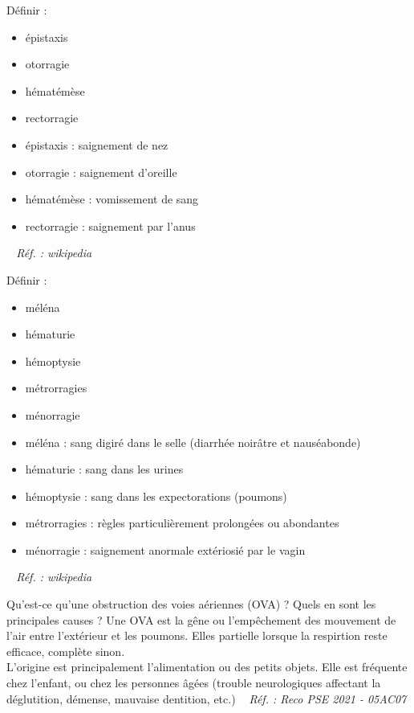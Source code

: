 \documentclass[grid,avery5371,landscape]{flashcards}
\makeatletter
\newcounter{nocarte}
\newcommand{\categ}[1]{%
  \def\@categ{#1}%
  \setcounter{nocarte}{0}%
}
\newcommand{\source}[1]{%
  \medskip
  \itshape%
   ~ \hfill Réf. : #1}
\makeatother
\begin{document}
\color[HTML]{01DF01}
\categ{CE-CP-REG}
\begin{flashcard}[bilan]{
 Définir : \begin{itemize} 
\item épistaxis  
\item otorragie      
\item hématémèse    
\item rectorragie     
\end{itemize}   }
  \begin{itemize}  
\item épistaxis : saignement de nez
\item  otorragie : saignement d'oreille
\item  hématémèse : vomissement de sang
\item  rectorragie : saignement par l'anus
\end{itemize}
  \source{wikipedia}
\end{flashcard}


\color[HTML]{01DF01}
\categ{CE-CP-REG}
\begin{flashcard}[bilan]{
 Définir : \begin{itemize} 
\item méléna
\item hématurie
\item hémoptysie   
\item métrorragies  
\item ménorragie   \end{itemize}   }
  \begin{itemize}  
\item méléna : sang digiré dans le selle (diarrhée noirâtre et nauséabonde)
\item  hématurie : sang dans les urines
\item  hémoptysie : sang dans les expectorations (poumons)
\item  métrorragies : règles particulièrement prolongées ou abondantes
\item  ménorragie : saignement anormale extériosié par le vagin         
\end{itemize}
  \source{wikipedia}
\end{flashcard}


\color[HTML]{003273}
\categ{PSE}
\begin{flashcard}[bilan]{
 Qu'est-ce qu'une obstruction des voies aériennes (OVA) ? Quels en sont les principales causes ?   }
  Une OVA est la gêne ou l'empêchement des mouvement de l'air entre l'extérieur et les poumons. Elles partielle lorsque la respirtion reste efficace, complète sinon. \\
L'origine est principalement l'alimentation ou des petits objets. Elle est fréquente chez l'enfant, ou chez les personnes âgées (trouble neurologiques affectant la déglutition, démense, mauvaise dentition, etc.)
  \source{Reco PSE 2021 - 05AC07}
\end{flashcard}
\end{document}
